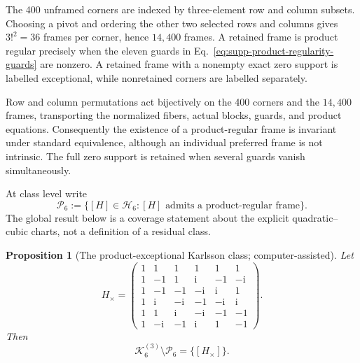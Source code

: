 \documentclass[aps,prx,reprint,nofootinbib,twoside,superscriptaddress,longbibliography,floatfix]{revtex4-2}
\newtheorem{proposition}[theorem]{Proposition}
\theoremstyle{definition}
\newcommand{\I}{\mathrm i}
\newcommand{\HH}{\mathcal H}
\newcommand{\KK}{\mathcal K}
\begin{document}
The 400 unframed corners are indexed by three-element row and column subsets.  Choosing a pivot and ordering the other two selected rows and columns gives $3!^2=36$ frames per corner, hence $14{,}400$ frames.  A retained frame is product regular precisely when the eleven guards in Eq.~\eqref{eq:supp-product-regularity-guards} are nonzero.  A retained frame with a nonempty exact zero support is labelled exceptional, while nonretained corners are labelled separately.

Row and column permutations act bijectively on the 400 corners and the $14{,}400$ frames, transporting the normalized fibers, actual blocks, guards, and product equations. Consequently the existence of a product-regular frame is invariant under standard equivalence, although an individual preferred frame is not intrinsic. The full zero support is retained when several guards vanish simultaneously.

At class level write
\begin{equation}
\mathcal P_6:=\{[H]\in\HH_6:\text{$[H]$ admits a product-regular frame}\}.
\label{eq:supp-product-regular-class-locus}
\end{equation}
The global result below is a coverage statement about the explicit quadratic--cubic charts, not a definition of a residual class.


\begin{proposition}[The product-exceptional Karlsson class; computer-assisted]
\label{prop:supp-karlsson-product-exceptional-singleton}
Let
\begin{equation}
H_\times=
\begin{pmatrix}
1&1&1&1&1&1\\
1&-1&1&\I&-1&-\I\\
1&-1&-1&-\I&\I&1\\
1&\I&-\I&-1&-\I&\I\\
1&1&\I&-\I&-1&-1\\
1&-\I&-1&\I&1&-1
\end{pmatrix}.
\label{eq:supp-product-exceptional-karlsson-matrix}
\end{equation}
Then
\begin{equation}
\KK_6^{(3)}\setminus\mathcal P_6=\{[H_\times]\}.
\label{eq:supp-karlsson-product-exceptional-singleton}
\end{equation}
\end{proposition}
\end{document}
